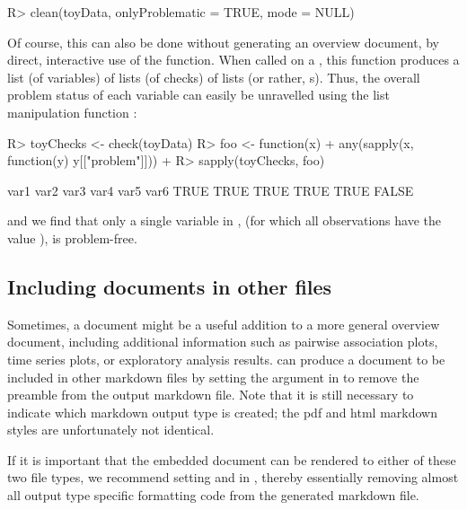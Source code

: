 \documentclass[article,shortnames]{jss}
\begin{document}
\begin{Schunk}
\begin{Sinput}
R> clean(toyData, onlyProblematic = TRUE, mode = NULL)
\end{Sinput}
\end{Schunk}

Of course, this can also be done without generating an overview
document, by direct, interactive use of the  function. When
called on a , this function produces a list (of
variables) of lists (of checks) of lists (or rather,
s). Thus, the overall problem status of each variable
can easily be unravelled using the list manipulation function
:

\begin{Schunk}
\begin{Sinput}
R> toyChecks <- check(toyData)
R> foo <- function(x) {
+    any(sapply(x, function(y) y[["problem"]]))
+  }
R> sapply(toyChecks, foo)
\end{Sinput}
\begin{Soutput}
 var1  var2  var3  var4  var5  var6 
 TRUE  TRUE  TRUE  TRUE  TRUE FALSE 
\end{Soutput}
\end{Schunk}

and we find that only a single variable in ,  (for which all
observations have the value ), is problem-free.


\subsection[Including dataMaid documents in other files]{Including  documents in other files}
Sometimes, a  document might be a useful addition to a
more general overview document, including additional information such
as pairwise association plots, time series plots, or exploratory
analysis results.   can produce a document to be
included in other  markdown files by setting the
 argument in  to remove the preamble
from the output  markdown file. Note that it is still
necessary to indicate which  markdown output type is
created; the pdf and html  markdown styles are
unfortunately not identical.

If it is important that the embedded  document can be
rendered to either of these two file types, we recommend setting
 and  in , thereby
essentially removing almost all output type specific formatting code
from the generated  markdown file.
\end{document}
